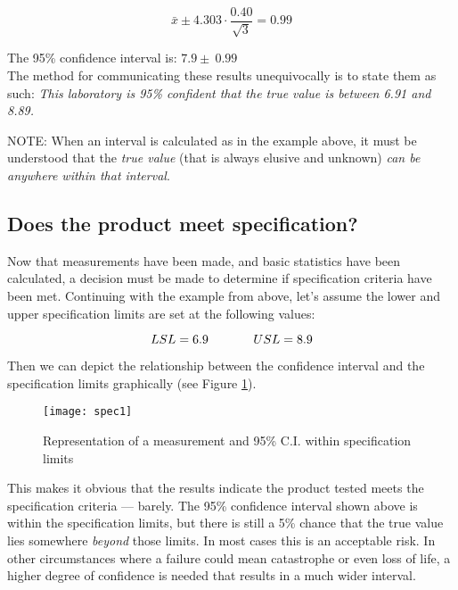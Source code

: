 \begin{center}
\begin{equation}
\bar{x} \pm 4.303 \cdot \frac{0.40}{\sqrt{3}}  =0.99
\end{equation}

\end{center}
The 95\% confidence interval is: $ 7.9 \pm \ 0.99 $\\

The method for communicating these results unequivocally is to state them as such: \textit{This laboratory is 95\% confident that the true value is between 6.91 and 8.89.}

NOTE: When an interval is calculated as in the example above, it must be understood that the \textit{true value} (that is always elusive and unknown) \textit{can be anywhere within that interval}.

\subsection{Does the product meet specification?}

Now that measurements have been made, and basic statistics have been calculated, a decision must be made to determine if specification criteria have been met.  Continuing with the example from above, let's assume the lower and  upper specification limits are set at the following values:

\begin{center}
\begin{equation}
LSL = 6.9  \hspace{0.5in}  USL = 8.9 
\end{equation}

\end{center}

Then we can depict the relationship between the confidence interval and the specification limits graphically (see Figure \ref{fig2}).
\begin{figure}[h]\caption{Representation of a measurement and 95\% C.I. within specification limits}\label{fig2}
\begin{center}
\texttt{[image: spec1]}
\end{center}
\end{figure}

This makes it obvious that the results indicate the product tested meets the specification criteria --- barely.  The 95\% confidence interval shown above is within the specification limits, but there is still a 5\% chance that the true value lies somewhere \textit{beyond} those limits.  In most cases this is an acceptable risk. In other circumstances where a failure could mean catastrophe or even loss of life, a higher degree of confidence is needed that results in a much wider interval.\\


